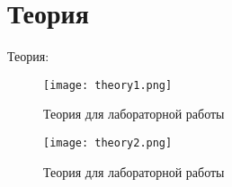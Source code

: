\chapter{Теория}
\label{ch:intro}

Теория:\\

\begin{figure}[H]
    \centering
    \texttt{[image: theory1.png]}
    \caption{Теория для лабораторной работы}
\end{figure}

\begin{figure}[H]
    \centering
    \texttt{[image: theory2.png]}
    \caption{Теория для лабораторной работы}
\end{figure}


\endinput